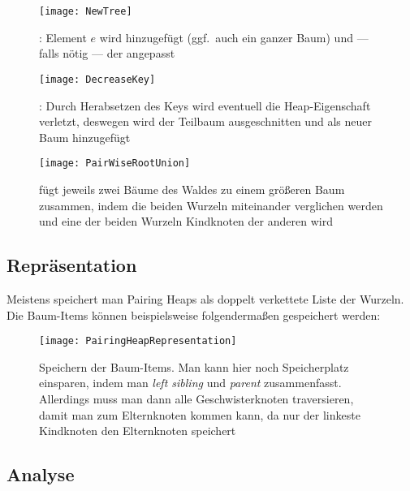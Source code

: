 \begin{minipage}{.475\textwidth}
  \begin{figure}[H]
    \texttt{[image: NewTree]}
    \caption{: Element \( e \) wird hinzugefügt (ggf.\ auch ein ganzer Baum) und --- falls nötig --- der  angepasst}
  \end{figure}
\end{minipage}
\hfill
\begin{minipage}{.475\textwidth}
  \vspace{1cm}
  \begin{figure}[H]
    \texttt{[image: DecreaseKey]}
    \caption{: Durch Herabsetzen des Keys wird eventuell die Heap-Eigenschaft verletzt, deswegen wird der Teilbaum ausgeschnitten und als neuer Baum hinzugefügt}
  \end{figure}
\end{minipage}

\begin{figure}[H]
  \texttt{[image: PairWiseRootUnion]}
  \caption{ fügt jeweils zwei Bäume des Waldes zu einem größeren Baum zusammen, indem die beiden Wurzeln miteinander verglichen werden und eine der beiden Wurzeln Kindknoten der anderen wird}
\end{figure}

\subsection{Repräsentation}

Meistens speichert man Pairing Heaps als doppelt verkettete Liste der Wurzeln. Die Baum-Items können beispielsweise folgendermaßen gespeichert werden:

\begin{figure}[H]
  \texttt{[image: PairingHeapRepresentation]}
  \caption{Speichern der Baum-Items. Man kann hier noch Speicherplatz einsparen, indem man \emph{left sibling} und \emph{parent} zusammenfasst. Allerdings muss man dann alle Geschwisterknoten traversieren, damit man zum Elternknoten kommen kann, da nur der linkeste Kindknoten den Elternknoten speichert}
\end{figure}

\subsection{Analyse}

